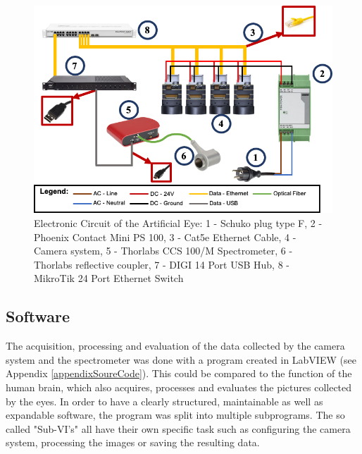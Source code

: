 \begin{figure}
\begin{center}
\includegraphics[width=12cm]{Pictures/Electrical Setup}
\caption[Electronic Circuit of the Artificial Eye:]{Electronic Circuit of the Artificial Eye: 1 - Schuko plug type F\cite{MuellerPlastik}, 2 - Phoenix Contact Mini PS 100\cite{RSComponents}, 3 - Cat5e Ethernet Cable\cite{ComputerCableStore}, 4 - Camera system\cite{Labs}, 5 - Thorlabs CCS 100/M Spectrometer\cite{ThorlabsCCS}, 6 - Thorlabs reflective coupler\cite{ThorlabsCoupler}, 7 -  DIGI 14 Port USB Hub\cite{DIGI}, 8 - MikroTik 24 Port Ethernet Switch\cite{MikroTik}}
\label{ElectricalSetup}
\end{center}
\end{figure}

\subsection{Software}
The acquisition, processing and evaluation of the data collected by the camera system and the spectrometer was done with a program created in LabVIEW (see Appendix \ref{appendixSoureCode}). This could be compared to the function of the human brain, which also acquires, processes and evaluates the pictures collected by the eyes. In order to have a clearly structured, maintainable as well as expandable software, the program was split into multiple subprograms. The so called "Sub-VI's" all have their own specific task such as configuring the camera system, processing the images or saving the resulting data.\\

